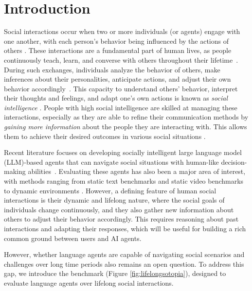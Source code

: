 \section{Introduction}
\label{sec:introduction}

Social interactions occur when two or more individuals (or agents) engage with one another, with each person's behavior being influenced by the actions of others \citep{REIS1991269, Turner1988}. These interactions are a fundamental part of human lives, as people continuously teach, learn, and converse with others throughout their lifetime~\citep{HARI2015181}. During such exchanges, individuals analyze the behavior of others, make inferences about their personalities, anticipate actions, and adjust their own behavior accordingly~\citep{German2020, pianesi_personality_2008}. This capacity to understand others' behavior, interpret their thoughts and feelings, and adapt one's own actions is known as \textit{social intelligence} \citep{marius_intelligence_2022, zhou2023sotopia, li2024socialintelligencedatainfrastructure}. People with high social intelligence are skilled at managing these interactions, especially as they are able to refine their communication methods by \emph{gaining more information} about the people they are interacting with. This allows them to achieve their desired outcomes in various social situations \citep{Holloway2020}.

Recent literature focuses on developing socially intelligent large language model (LLM)-based agents that can navigate social situations with human-like decision-making abilities~\citep{mathur2024advancingsocialintelligenceai, wang2024objectivelybenchmarkingsocialintelligence, park2023generative,zhou2023sotopia,wang2024sotopiapiinteractivelearningsocially}. Evaluating these agents has also been a major area of interest, with methods ranging from static text benchmarks \citep{sap2019socialiqacommonsensereasoningsocial, le-etal-2019-revisiting} and static video benchmarks \citep{Zadeh_2019_CVPR} to dynamic environments \citep{zhang2024buildingcooperativeembodiedagents, zhou2023sotopia}. However, a defining feature of human social interactions is their dynamic and lifelong nature, where the social goals of individuals change continuously, and they also gather new information about others to adjust their behavior accordingly. This requires reasoning about past interactions and adapting their responses, which will be useful for building a rich common ground between users and AI agents.

However, whether language agents are capable of navigating social scenarios and challenges over long time periods also remains an open question. To address this gap, we introduce the \lifelongsotopia benchmark (Figure \ref{fig:lifelongsotopia}), designed to evaluate language agents over lifelong social interactions. 

